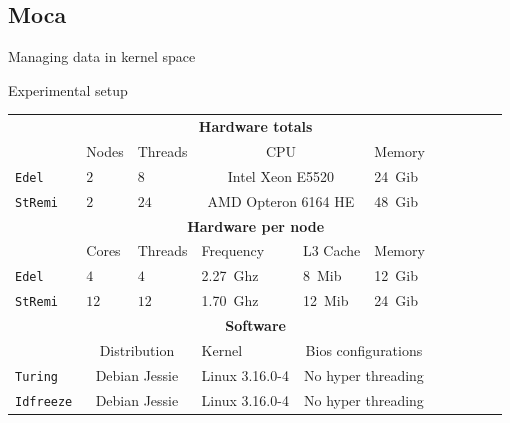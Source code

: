 \documentclass[xcolor={usenames,dvipsnames},hyperref={pdfusetitle}]{beamer}
\begin{document}
\subsection*{Moca}

\setcounter{framenumber}{\value{finalframe}}
\begin{frame}{Managing data in kernel space}
    \centering
    \resizebox{!}{.85\textheight}{
        
    }
\end{frame}


\setcounter{framenumber}{\value{finalframe}}
\begin{frame}{Experimental setup}
    \small
    \begin{tabular}{lllllllllll}
        \toprule
        & \multicolumn{5}{c}{\textbf{Hardware totals}}\\
        \cmidrule(lr){2-6}
        & Nodes & Threads & \multicolumn{2}{c}{CPU} & Memory \\
        \cmidrule(lr){2-6}
        \texttt{Edel}    & $2$ & $8$  & \multicolumn{2}{c}{Intel Xeon E5520}      & \SI{24}{Gib} \\
        \texttt{StRemi} & $2$ & $24$ & \multicolumn{2}{c}{AMD Opteron 6164 HE }& \SI{48}{Gib} \\
        \midrule
        & \multicolumn{5}{c}{\textbf{Hardware per node}}\\
        \cmidrule(lr){2-6}
        & Cores & Threads & Frequency & L3 Cache & Memory \\
        \cmidrule(lr){2-6}
        \texttt{Edel}   & $4$  & $4$   & \SI{2.27}{Ghz}& \SI{8}{Mib}  & \SI{12}{Gib} \\
        \texttt{StRemi} & $12$ & $12$  & \SI{1.70}{Ghz}& \SI{12}{Mib} & \SI{24}{Gib}\\
        \midrule
        & \multicolumn{5}{c}{\textbf{Software}}\\
        \cmidrule(lr){2-6}
        & \multicolumn{2}{c}{Distribution} & Kernel &
            \multicolumn{2}{c}{Bios configurations} \\
        \cmidrule(lr){2-6}
        \texttt{Turing}   & \multicolumn{2}{c}{Debian Jessie} & Linux 3.16.0-4 &
            \multicolumn{2}{c}{No hyper threading} \\
        \texttt{Idfreeze} & \multicolumn{2}{c}{Debian Jessie} & Linux 3.16.0-4 &
            \multicolumn{2}{c}{No hyper threading}\\
        \bottomrule
    \end{tabular}
\end{frame}
\end{document}
